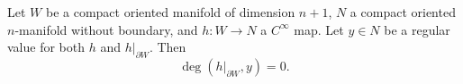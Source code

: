 Let $W$ be a compact oriented manifold of dimension $n + 1$, $N$ a compact oriented $n$-manifold without boundary, and $h: W \to N$ a $C^\infty$ map. Let $y \in N$ be a regular value for both $h$ and $h|_{\partial W}$. Then
$$
\deg(h|_{\partial W}, y) = 0.
$$
